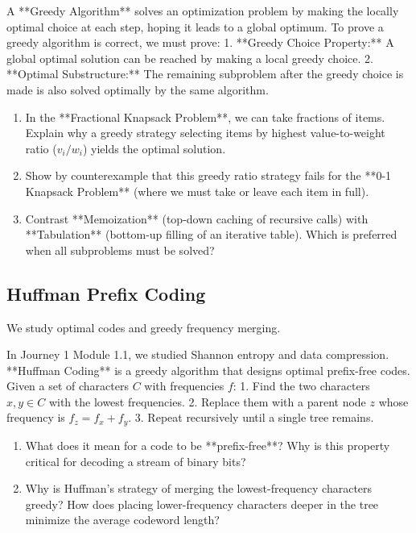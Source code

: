 \documentclass[12pt, a4paper]{book}
\begin{document}
\begin{explobox}
A **Greedy Algorithm** solves an optimization problem by making the locally optimal choice at each step, hoping it leads to a global optimum.
To prove a greedy algorithm is correct, we must prove:
1. **Greedy Choice Property:** A global optimal solution can be reached by making a local greedy choice.
2. **Optimal Substructure:** The remaining subproblem after the greedy choice is made is also solved optimally by the same algorithm.
\begin{enumerate}[label=(\alph*), leftmargin=*]
  \item In the **Fractional Knapsack Problem**, we can take fractions of items.
        Explain why a greedy strategy selecting items by highest value-to-weight ratio ($v_i/w_i$) yields the optimal solution.
  \item Show by counterexample that this greedy ratio strategy fails for the **0-1 Knapsack Problem** (where we must take or leave each item in full).
  \item Contrast **Memoization** (top-down caching of recursive calls) with **Tabulation** (bottom-up filling of an iterative table). Which is preferred when all subproblems must be solved?
\end{enumerate}
\end{explobox}

\subsection{ Huffman Prefix Coding}

We study optimal codes and greedy frequency merging.

\begin{explobox}
In Journey 1 Module 1.1, we studied Shannon entropy and data compression.
**Huffman Coding** is a greedy algorithm that designs optimal prefix-free codes.
Given a set of characters $C$ with frequencies $f$:
1. Find the two characters $x, y \in C$ with the lowest frequencies.
2. Replace them with a parent node $z$ whose frequency is $f_z = f_x + f_y$.
3. Repeat recursively until a single tree remains.
\begin{enumerate}[label=(\alph*), leftmargin=*]
  \item What does it mean for a code to be **prefix-free**? Why is this property critical for decoding a stream of binary bits?
  \item Why is Huffman's strategy of merging the lowest-frequency characters greedy?
        How does placing lower-frequency characters deeper in the tree minimize the average codeword length?
\end{enumerate}
\end{explobox}
\end{document}
